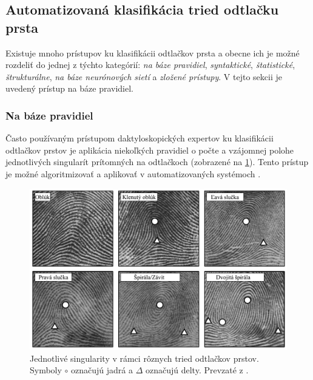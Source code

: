   \subsection{Automatizovaná klasifikácia tried odtlačku prsta} \label{sec:auto_klasif}
  Existuje mnoho prístupov ku klasifikácii odtlačkov prsta a obecne ich je možné rozdeliť do jednej z týchto kategórií: \emph{na báze pravidiel},
  \emph{syntaktické}, \emph{štatistické}, \emph{štrukturálne}, \emph{na báze neurónových sietí} a \emph{zložené prístupy}. V tejto sekcii je uvedený
  prístup na báze pravidiel.

  \subsubsection*{Na báze pravidiel} \label{sec:rule-based}
  Často používaným prístupom daktyloskopických expertov ku klasifikácii odtlačkov prstov je aplikácia niekoľkých pravidiel o počte a vzájomnej polohe
  jednotlivých singularít prítomných na odtlačkoch (zobrazené na \ref{obr:singularity_v_triedach}). Tento prístup je možné algoritmizovať a aplikovať
  v automatizovaných systémoch \cite{Handbook}.

  \begin{figure}[h]
    \centering
    \includegraphics[width=0.7\linewidth]{obrazky-figures/singularity_v_triedach.png}
    \caption{Jednotlivé singularity v rámci rôznych tried odtlačkov prstov. Symboly $\circ{}$ označujú jadrá a $\Delta{}$ označujú delty.
    Prevzaté z \cite{Handbook}.}
    \label{obr:singularity_v_triedach}
  \end{figure}

